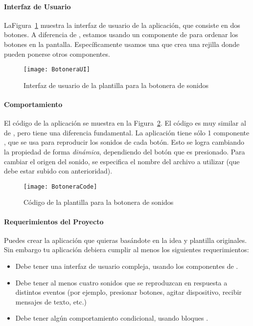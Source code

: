 \paragraph{Interfaz de Usuario}

LaFigura~\ref{fig:botoneraUI} muestra la interfaz de usuario de la aplicación, que consiste en dos botones. A diferencia de , estamos usando un componente de  para ordenar los botones en la pantalla. Específicamente usamos una  que crea una rejilla donde pueden ponerse otros componentes.

\begin{figure}[H]
  \centering
  \texttt{[image: BotoneraUI]}
  \caption{Interfaz de usuario de la plantilla para la botonera de sonidos}
  \label{fig:botoneraUI}
\end{figure}

\paragraph{Comportamiento}

El código de la aplicación se muestra en la Figura~\ref{fig:botoneraCode}. El código es muy similar al de , pero tiene una diferencia fundamental. La aplicación tiene sólo 1 componente , que se usa para reproducir los sonidos de cada botón. Esto se logra cambiando la propiedad  de forma \emph{dinámica}, dependiendo del botón que es presionado. Para cambiar el origen del sonido, se especifica el nombre del archivo a utilizar (que debe estar subido con anterioridad).

\begin{figure}[H]
  \centering
  \texttt{[image: BotoneraCode]}
  \caption{Código de la plantilla para la botonera de sonidos}
  \label{fig:botoneraCode}
\end{figure}

\paragraph{Requerimientos del Proyecto}

Puedes crear la aplicación que quieras basándote en la idea y plantilla originales. Sin embargo tu aplicación debiera cumplir al menos los siguientes requerimientos:

\begin{itemize}

\item Debe tener una interfaz de usuario compleja, usando los componentes de .

\item Debe tener al menos cuatro sonidos que se reproduzcan en respuesta a distintos eventos (por ejemplo, presionar botones, agitar dispositivo, recibir mensajes de texto, etc.)

\item Debe tener algún comportamiento condicional, usando bloques .

\end{itemize}


